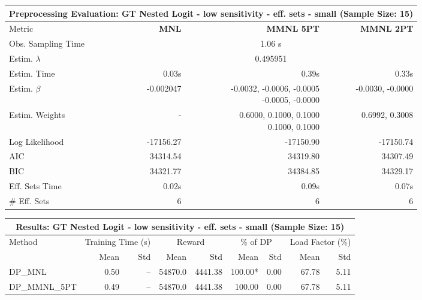 
\begin{samepage}
\begin{center}
  \small
  \begin{tabular}{l|r|r|r}
    \toprule
    \multicolumn{4}{c}{\textbf{Preprocessing Evaluation: GT Nested Logit - low sensitivity - eff. sets - small (Sample Size: 15)}} \\
    \midrule
    Metric & \textbf{MNL} & \textbf{MMNL 5PT} & \textbf{MMNL 2PT} \\
    \midrule
    Obs. Sampling Time & \multicolumn{3}{c}{1.06 s} \\
    Estim. $\lambda$ & \multicolumn{3}{c}{0.495951} \\
    Estim. Time & 0.03s & 0.39s & 0.33s \\
    Estim. $\beta$ & -0.002047 & \makecell[tr]{-0.0032, -0.0006, -0.0005 \\ -0.0005, -0.0000} & -0.0030, -0.0000 \\
    Estim. Weights & - & \makecell[tr]{0.6000, 0.1000, 0.1000 \\ 0.1000, 0.1000} & 0.6992, 0.3008 \\
    Log Likelihood & -17156.27 & -17150.90 & -17150.74 \\
    AIC & 34314.54 & 34319.80 & 34307.49 \\
    BIC & 34321.77 & 34384.85 & 34329.17 \\
    Eff. Sets Time & 0.02s & 0.09s & 0.07s \\
    \# Eff. Sets & 6 & 6 & 6 \\
    \bottomrule
  \end{tabular}
\end{center}
\begin{center}
  \small
  \begin{tabular}{l|rr|rr|rr|rr}
    \toprule
    \multicolumn{9}{c}{\textbf{Results: GT Nested Logit - low sensitivity - eff. sets - small (Sample Size: 15)}} \\
    \midrule
    Method & \multicolumn{2}{c|}{Training Time (s)} & \multicolumn{2}{c|}{Reward} & \multicolumn{2}{c|}{\% of DP} & \multicolumn{2}{c}{Load Factor (\%)} \\
    & Mean & Std & Mean & Std & Mean & Std & Mean & Std \\
    \midrule
    DP\_MNL      &     0.50 &    -- &    54870.0 &    4441.38 & 100.00* &    0.00 &   67.78 &    5.11 \\
    DP\_MMNL\_5PT &     0.49 &    -- &    54870.0 &    4441.38 &  100.00 &    0.00 &   67.78 &    5.11 \\

\end{tabular}
\end{center}
\end{samepage}
